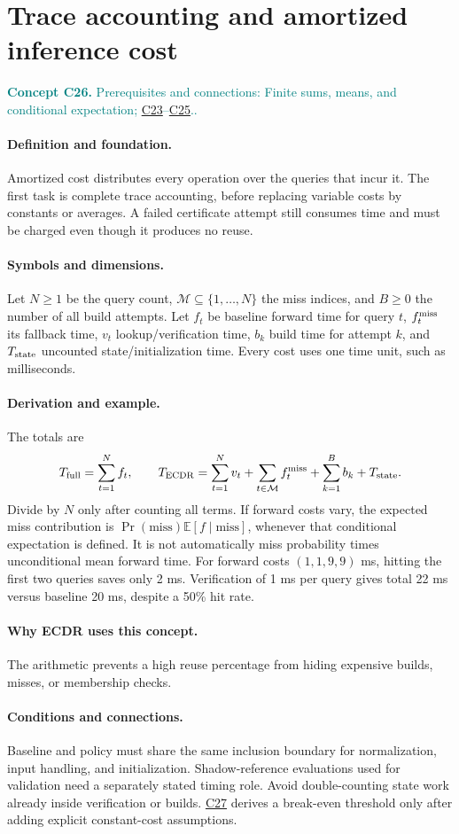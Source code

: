 \documentclass[11pt,a4paper]{article}
\newcommand{\E}{\mathbb E}
\newcommand{\conceptid}{Front matter}
\newcommand{\concept}[3]{\clearpage\renewcommand{\conceptid}{#1}%
\section{#2}\label{concept:#1}%
\textcolor{teal}{\textbf{Concept #1.} Prerequisites and connections: #3.}\par
\typeout{ECDR-CONCEPT-START #1 PAGE=\thepage}}
\begin{document}
\concept{C26}{Trace accounting and amortized inference cost}{Finite sums, means, and conditional expectation; \hyperref[concept:C23]{C23}--\hyperref[concept:C25]{C25}.}
\paragraph{Definition and foundation.}
Amortized cost distributes every operation over the queries that incur it. The first task is complete trace accounting, before replacing variable costs by constants or averages. A failed certificate attempt still consumes time and must be charged even though it produces no reuse.
\paragraph{Symbols and dimensions.}
Let $N\ge1$ be the query count, $\mathcal M\subseteq\{1,\ldots,N\}$ the miss indices, and $B\ge0$ the number of all build attempts. Let $f_t$ be baseline forward time for query $t$, $f_t^{\rm miss}$ its fallback time, $v_t$ lookup/verification time, $b_k$ build time for attempt $k$, and $T_{\rm state}$ uncounted state/initialization time. Every cost uses one time unit, such as milliseconds.
\paragraph{Derivation and example.}
The totals are
\[
 T_{\rm full}=\sum_{t=1}^{N}f_t,\qquad
 T_{\rm ECDR}=\sum_{t=1}^{N}v_t+
 \sum_{t\in\mathcal M}f_t^{\rm miss}+
 \sum_{k=1}^{B}b_k+T_{\rm state}.
\]
Divide by $N$ only after counting all terms. If forward costs vary, the expected miss contribution is $\Pr(\mathrm{miss})\E[f\mid\mathrm{miss}]$, whenever that conditional expectation is defined. It is not automatically miss probability times unconditional mean forward time.
For forward costs $(1,1,9,9)$ ms, hitting the first two queries saves only 2 ms. Verification of 1 ms per query gives total 22 ms versus baseline 20 ms, despite a 50\% hit rate.
\paragraph{Why ECDR uses this concept.}
The arithmetic prevents a high reuse percentage from hiding expensive builds, misses, or membership checks.
\paragraph{Conditions and connections.}
Baseline and policy must share the same inclusion boundary for normalization, input handling, and initialization. Shadow-reference evaluations used for validation need a separately stated timing role. Avoid double-counting state work already inside verification or builds. \hyperref[concept:C27]{C27} derives a break-even threshold only after adding explicit constant-cost assumptions.
\par\label{endconcept:C26}
\end{document}
